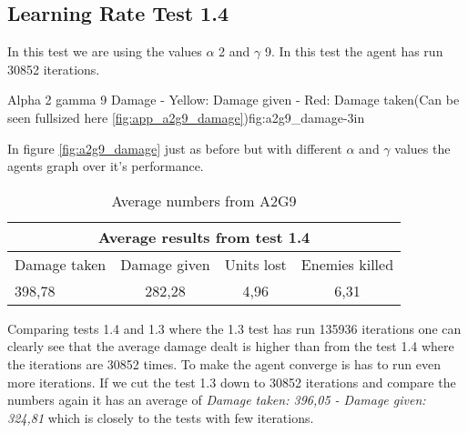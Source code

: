 \subsection*{Learning Rate Test 1.4}
In this test we are using the values $\alpha$ 2 and $\gamma$ 9. In this test the agent has run 30852 iterations.


			{Alpha 2 gamma 9 Damage - Yellow: Damage given - Red: Damage taken(Can be seen fullsized here \ref{fig:app_a2g9_damage})}{fig:a2g9_damage}{-3in}

In figure \ref{fig:a2g9_damage} just as before but with different $\alpha$ and $\gamma$ values the agents graph over it's performance.




\begin{centering}
\begin{table}
 \begin{tabular}{|l|c|c|c|}
	\multicolumn{4}{c}{Average results from test 1.4} \\
	\hline
		Damage taken & Damage given & Units lost & Enemies killed\\
	\hline
		398,78 & 282,28 & 4,96 & 6,31 \\
		\hline
\end{tabular}

\label{test1.4}
\caption{Average numbers from A2G9}
\end{table}
\end{centering}


Comparing tests 1.4 and 1.3 where the 1.3 test has run 135936 iterations one can clearly see that the average damage dealt is higher than from the test 1.4 where the iterations are 30852 times. To make the agent converge is has to run even more iterations. If we cut the test 1.3 down to 30852 iterations and compare the numbers again it has an average of \textit{Damage taken: 396,05 - Damage given: 324,81} which is closely to the tests with few iterations.